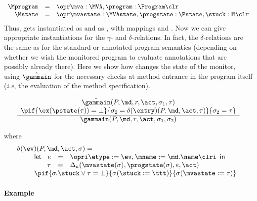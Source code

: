 \[
\begin{array}{rcl}
\Mprogram & =  & \opr \mva : \MVA, \program : \Program \clr\\
\Mstate & = & \opr \mvastate : \MVAstate, \progstate : \Pstate, \stuck
: \mathbb{B} \clr
\end{array}
\]
Thus, \FullProgram gets instantiated as \Mprogram and \FullState as
\Mstate, with mappings \program and \progstate. Now we can give
appropriate instantiations for the \(\gamma\)- and
\(\delta\)-relations. In fact, the \(\delta\)-relations are the same as
for the standard or annotated program semantics (depending on whether
we wish the monitored program to evaluate annotations that are
possibly already there). Here we show how \gammain changes the state
of the monitor, using \(\hat\gammain\) for the necessary checks at
method entrance in the program itself (\emph{i.e}, the evaluation of
the method specification).

\[
\begin{array}{c}
\hat\gammain(P, \md, r, \act, \sigma_1, \tau) \\
\pif{\ex(\pstate(\tau)) = \bot}
    {\sigma_2 = \delta(\entry)(P, \md, \act, \tau)}
    {\sigma_2 = \tau}\\
\hline
\gammain(P, \md, r, \act, \sigma_1, \sigma_2)
\end{array}
\]

\noindent where
\[
\begin{array}{l}
\delta(\ev)(P, \md, \act, \sigma) =\\
\qquad
\begin{array}[t]{l}
\mathsf{let\ }
\begin{array}[t]{rcl}
  e & = & \opri \etype := \ev, \mname := \md.\name \clri\\
 \tau & = & \Delta_a(\mvastate(\sigma), \progstate(\sigma), e, \act)
\end{array}
\mathsf{in\ }\\
\pif{\sigma.\stuck \vee \tau = \bot}
    {\sigma (\stuck := \ttt)}
    {\sigma (\mvastate := \tau)}
\end{array}
\end{array}
\]


\paragraph{Example}

